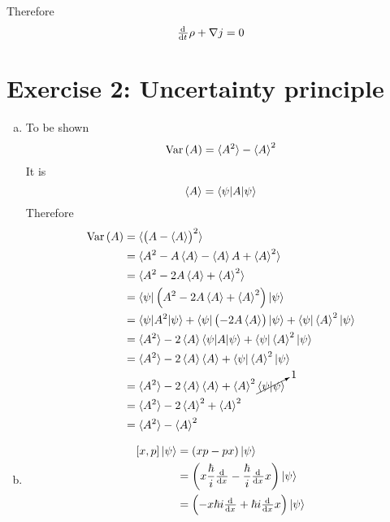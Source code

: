\documentclass[a4paper,german,12pt,smallheadings]{scrartcl}
\DeclareMathOperator{\Var}{Var}
\begin{document}
Therefore
\begin{equation*}
  \od{}{t} \rho + \nabla j = 0
\end{equation*}

\section*{Exercise 2: Uncertainty principle}
\begin{enumerate}[a)]
  \item
    To be shown
    \begin{equation*}
      \Var\del{A} = \braket{A^2} - \braket{A}^2
    \end{equation*}
    It is
    \begin{equation*}
      \braket{A} = \braket{\psi|A|\psi}
    \end{equation*}
    Therefore
    \begin{align*}
      \Var\del{A} &= \braket{\del{A - \braket{A}}^2} \\
                  &= \braket{A^2 - A\braket{A} - \braket{A}A + \braket{A}^2} \\
                  &= \braket{A^2 - 2A\braket{A} + \braket{A}^2} \\
                  &= \braket{\psi|\del{A^2 - 2A\braket{A} + \braket{A}^2}|\psi} \\
                  &= \braket{\psi|A^2|\psi} + \braket{\psi|\del{-2A\braket{A}}|\psi}+ \braket{\psi|\braket{A}^2|\psi} \\
                  &= \braket{A^2} - 2\braket{A}\braket{\psi|A|\psi} + \braket{\psi|\braket{A}^2|\psi} \\
                  &= \braket{A^2} - 2\braket{A}\braket{A} + \braket{\psi|\braket{A}^2|\psi} \\
                  &= \braket{A^2} - 2\braket{A}\braket{A} + \braket{A}^2 \cancelto{1}{\braket{\psi|\psi}} \\
                  &= \braket{A^2} - 2\braket{A}^2 + \braket{A}^2 \\
                  &= \braket{A^2} - \braket{A}^2
    \end{align*}
  \item
    \begin{align*}
      \sbr{x,p} \ket{\psi} &= \del{xp - px}\ket{\psi} \\
                          &= \del{x \frac{\hbar}{i} \od{}{x} - \frac{\hbar}{i} \od{}{x} x} \ket{\psi} \\
                          &= \del{-x \hbar i \od{}{x} + \hbar i \od{}{x} x} \ket{\psi} \\

\end{align*}
\end{enumerate}
\end{document}
